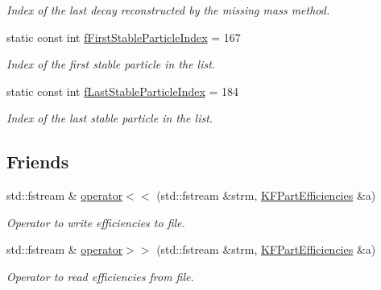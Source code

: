 \begin{DoxyCompactItemize}
\begin{DoxyCompactList}\small\item\em Index of the last decay reconstructed by the missing mass method. \end{DoxyCompactList}\item 
static const int \hyperlink{classKFPartEfficiencies_aa789fded121eb78a0d49505f9c58431c}{f\+First\+Stable\+Particle\+Index} = 167\hypertarget{classKFPartEfficiencies_aa789fded121eb78a0d49505f9c58431c}{}\label{classKFPartEfficiencies_aa789fded121eb78a0d49505f9c58431c}

\begin{DoxyCompactList}\small\item\em Index of the first stable particle in the list. \end{DoxyCompactList}\item 
static const int \hyperlink{classKFPartEfficiencies_a579eae22841ce1981c8aed97d316e7b8}{f\+Last\+Stable\+Particle\+Index} = 184\hypertarget{classKFPartEfficiencies_a579eae22841ce1981c8aed97d316e7b8}{}\label{classKFPartEfficiencies_a579eae22841ce1981c8aed97d316e7b8}

\begin{DoxyCompactList}\small\item\em Index of the last stable particle in the list. \end{DoxyCompactList}\end{DoxyCompactItemize}
\subsection*{Friends}
\begin{DoxyCompactItemize}
\item 
std\+::fstream \& \hyperlink{classKFPartEfficiencies_a903f9bf66d3cf46bcf72597e65c09aec}{operator$<$$<$} (std\+::fstream \&strm, \hyperlink{classKFPartEfficiencies}{K\+F\+Part\+Efficiencies} \&a)\hypertarget{classKFPartEfficiencies_a903f9bf66d3cf46bcf72597e65c09aec}{}\label{classKFPartEfficiencies_a903f9bf66d3cf46bcf72597e65c09aec}

\begin{DoxyCompactList}\small\item\em Operator to write efficiencies to file. \end{DoxyCompactList}\item 
std\+::fstream \& \hyperlink{classKFPartEfficiencies_a71e0bc1c241b95eca6f1a992761af178}{operator$>$$>$} (std\+::fstream \&strm, \hyperlink{classKFPartEfficiencies}{K\+F\+Part\+Efficiencies} \&a)\hypertarget{classKFPartEfficiencies_a71e0bc1c241b95eca6f1a992761af178}{}\label{classKFPartEfficiencies_a71e0bc1c241b95eca6f1a992761af178}

\begin{DoxyCompactList}\small\item\em Operator to read efficiencies from file. \end{DoxyCompactList}\end{DoxyCompactItemize}


